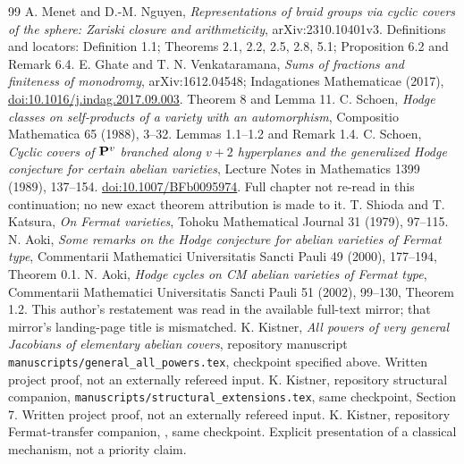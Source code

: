 \documentclass[11pt]{article}
\theoremstyle{remark}\newtheorem{remark}[theorem]{Remark}
\begin{document}
\begin{thebibliography}{99}
 A. Menet and D.-M. Nguyen,
\emph{Representations of braid groups via cyclic covers of the sphere:
Zariski closure and arithmeticity}, arXiv:2310.10401v3.
Definitions and locators: Definition 1.1; Theorems 2.1, 2.2, 2.5, 2.8,
5.1; Proposition 6.2 and Remark 6.4.
 E. Ghate and T. N. Venkataramana,
\emph{Sums of fractions and finiteness of monodromy},
arXiv:1612.04548; Indagationes Mathematicae (2017),
\href{https://doi.org/10.1016/j.indag.2017.09.003}{doi:10.1016/j.indag.2017.09.003}.
Theorem 8 and Lemma 11.
 C. Schoen, \emph{Hodge classes on self-products of a
variety with an automorphism}, Compositio Mathematica 65 (1988), 3--32.
Lemmas 1.1--1.2 and Remark 1.4.
 C. Schoen, \emph{Cyclic covers of $\mathbf P^v$ branched
along $v+2$ hyperplanes and the generalized Hodge conjecture for certain
abelian varieties}, Lecture Notes in Mathematics 1399 (1989), 137--154.
\href{https://doi.org/10.1007/BFb0095974}{doi:10.1007/BFb0095974}.
Full chapter not re-read in this continuation; no new exact theorem
attribution is made to it.
 T. Shioda and T. Katsura,
\emph{On Fermat varieties}, Tohoku Mathematical Journal 31 (1979), 97--115.
 N. Aoki, \emph{Some remarks on the Hodge conjecture for
abelian varieties of Fermat type}, Commentarii Mathematici Universitatis
Sancti Pauli 49 (2000), 177--194, Theorem 0.1.
 N. Aoki, \emph{Hodge cycles on CM abelian varieties of
Fermat type}, Commentarii Mathematici Universitatis Sancti Pauli 51 (2002),
99--130, Theorem 1.2. This author's restatement was read in the available
full-text mirror; that mirror's landing-page title is mismatched.
 K. Kistner, \emph{All powers of very general Jacobians
of elementary abelian covers}, repository manuscript
\texttt{manuscripts/general\_all\_powers.tex}, checkpoint specified above.
Written project proof, not an externally refereed input.
 K. Kistner, repository structural companion,
\texttt{manuscripts/structural\_extensions.tex}, same checkpoint,
Section 7. Written project proof, not an externally refereed input.
 K. Kistner, repository Fermat-transfer companion,
, same checkpoint.
Explicit presentation of a classical mechanism, not a priority claim.
\end{thebibliography}
\end{document}
